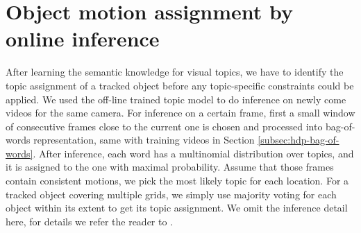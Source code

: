 \section{Object motion assignment by online inference}
\label{sec:semantic-inf}

After learning the semantic knowledge for visual topics, we have to identify the topic assignment of a tracked object before any topic-specific constraints could be applied.
We used the off-line trained topic model to do inference on newly come videos for the same camera. For inference on a certain frame, first a small window of consecutive frames close to the current one is chosen and processed into bag-of-words representation, same with training videos in Section \ref{subsec:hdp-bag-of-words}.  
After inference, each word has a multinomial distribution over topics, and it is assigned to the one with maximal probability. 
Assume that those frames contain consistent motions, we pick the most likely topic for each location. 
For a tracked object covering multiple grids, we simply use majority voting for each object within its extent to get its topic assignment.
We omit the inference detail here, for details we refer the reader to \cite{yee2006hierarchical}.
